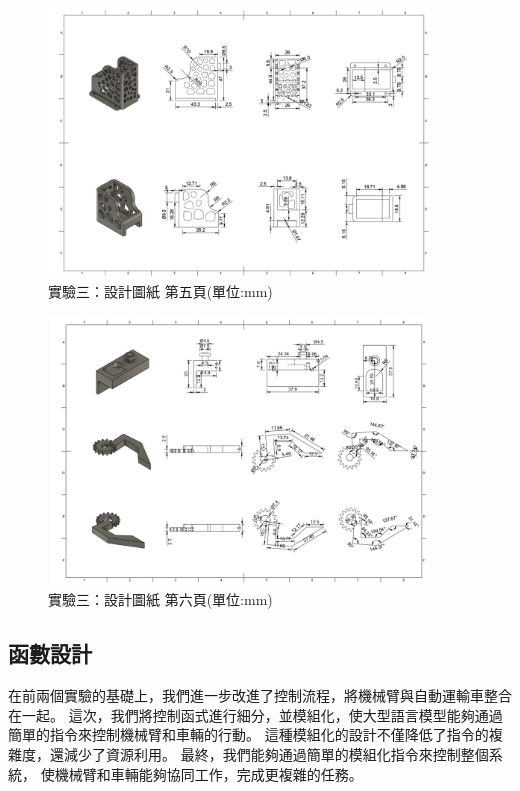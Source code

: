 \documentclass[class=NCU_thesis, crop=false]{standalone}
\begin{document}
\begin{figure}[htbp]
    \centering
    \includegraphics[width=0.9\textwidth]{figures/Armv3 (5).PNG}
    \caption{實驗三：設計圖紙 第五頁(單位:mm)}
    \label{fig:Armv3Drawing_p5}
\end{figure}

\begin{figure}[htbp]
    \centering
    \includegraphics[width=0.9\textwidth]{figures/Armv3 (6).PNG}
    \caption{實驗三：設計圖紙 第六頁(單位:mm)}
    \label{fig:Armv3Drawing_p6}
\end{figure}

\subsection{函數設計}
在前兩個實驗的基礎上，我們進一步改進了控制流程，將機械臂與自動運輸車整合在一起。
這次，我們將控制函式進行細分，並模組化，使大型語言模型能夠通過簡單的指令來控制機械臂和車輛的行動。
這種模組化的設計不僅降低了指令的複雜度，還減少了資源利用。
最終，我們能夠通過簡單的模組化指令來控制整個系統，
使機械臂和車輛能夠協同工作，完成更複雜的任務。
\end{document}
